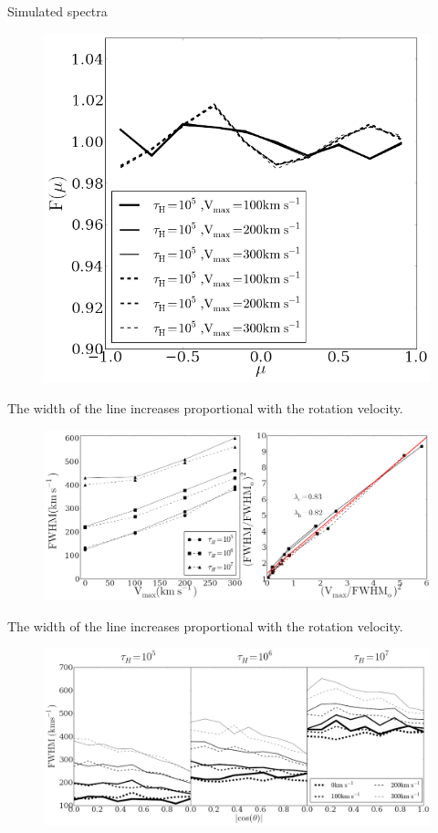 \documentclass{beamer}
\begin{document}
\begin{frame}{Simulated spectra}
\begin{figure}
\includegraphics[scale=0.4]{Figures/f5.png}
\end{figure}
\end{frame}


\begin{frame}{The width of the line increases proportional with the rotation velocity.}
\begin{figure}
\includegraphics[scale=0.16]{Figures/f7.png}
\end{figure}
\end{frame}


\begin{frame}{The width of the line increases proportional with the rotation velocity.}
\begin{figure}
\includegraphics[scale=0.16]{Figures/f6.png}
\end{figure}
\end{frame}
\end{document}
